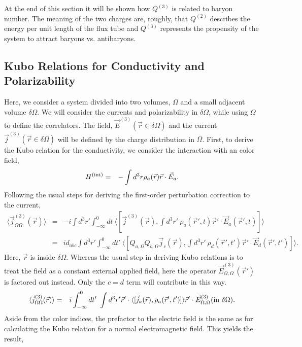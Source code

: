 \documentclass[aps, prc, 12pt, nofootinbib, showpacs, superscriptaddress, tightenlines, groupedaddress]{revtex4-2}
\begin{document}
At the end of this section it will be shown how $Q^{(3)}$ is related to baryon number. The meaning of the two charges are, roughly, that $Q^{(2)}$ describes the energy per unit length of the flux tube and $Q^{(3)}$ represents the propensity of the system to attract baryons vs. antibaryons.

\subsection{Kubo Relations for Conductivity and Polarizability}

Here, we consider a system divided into two volumes, $\Omega$ and a small adjacent volume $\delta\Omega$. We will consider the currents and polarizability in $\delta\Omega$, while using $\Omega$ to define the correlators. The field, $\vec{E}^{(3)}(\vec{r}\in\delta\Omega)$ and the current $\vec{j}^{(3)}(\vec{r}\in\delta\Omega)$ will be defined by the charge distribution in $\Omega$. First, to derive the Kubo relation for the conductivity, we consider the interaction with an color field,
\begin{eqnarray}
H^{\rm(int)}&=&-\int d^3r \rho_a(\vec{r})\vec{r}\cdot\vec{E}_a.
\end{eqnarray}
Following the usual steps for deriving the first-order perturbation correction to the current,
\begin{eqnarray}
\langle\vec{j}^{(3)}_{\Omega\Omega}(\vec{r})\rangle&=&-i\int d^3r'\int_{-\infty}^0 dt~\langle[\vec{j}^{(3)}(\vec{r}),
\int d^3r'~\rho_a(\vec{r}',t)\vec{r}'\cdot\vec{E}_a(\vec{r}',t)]\rangle\\
\nonumber
&=&id_{abc}\int d^3r'\int_{-\infty}^0 dt'~\langle[Q_{a,\Omega}Q_{b,\Omega}\vec{j}_c(\vec{r}),
\int d^3r'~\rho_d(\vec{r}',t')\vec{r}'\cdot\vec{E}_d(\vec{r}',t')]\rangle.
\end{eqnarray}
Here, $\vec{r}$ is inside $\delta\Omega$. Whereas the usual step in deriving Kubo relations is to treat the field as a constant external applied field, here the operator $\vec{E}_{\Omega,\Omega}^{(3)}(\vec{r}')$ is factored out instead. Only the $c=d$ term will contribute in this way.
\begin{eqnarray}
\langle\vec{j}^{(3)}_{\Omega\Omega}(\vec{r})\rangle&=&i\int_{-\infty}^0dt'~\int d^3r'\vec{r}'\cdot
\langle[\vec{j}_a(\vec{r}),\rho_a(\vec{r}',t')]\rangle  \vec{r}'\cdot\vec{E}^{(3)}_{\Omega,\Omega}({\rm in}~\delta\Omega).
\end{eqnarray}
Aside from the color indices, the prefactor to the electric field is the same as for calculating the Kubo relation for a normal electromagnetic field. This yields the result,
\end{document}
